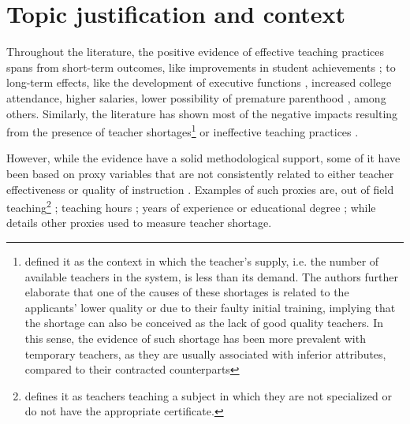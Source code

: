 \section{Topic justification and context}

Throughout the literature, the positive evidence of effective teaching practices spans from short-term outcomes, like improvements in student achievements \citep{Rockoff_2004, Rivkin_et_al_2005, Duflo_et_al_2009, Hanushek_et_al_2012, Muralidharan_et_al_2013, Chetty_et_al_2014a, Araujo_et_al_2016}; to long-term effects, like the development of executive functions \citep{Araujo_et_al_2016}, increased college attendance, higher salaries, lower possibility of premature parenthood \citep{Chetty_et_al_2014b}, among others. Similarly, the literature has shown most of the negative impacts resulting from the presence of teacher shortages\footnote{\citet{Bertoni_et_al_2020a} defined it as the context in which the teacher's supply, i.e. the number of available teachers in the system, is less than its demand. The authors further elaborate that one of the causes of these shortages is related to the applicants' lower quality or due to their faulty initial training, implying that the shortage can also be conceived as the lack of good quality teachers. In this sense, the evidence of such shortage has been more prevalent with temporary teachers, as they are usually associated with inferior attributes, compared to their contracted counterparts} or ineffective teaching practices \citep{Duflo_et_al_2009, Hanushek_et_al_2012, Muralidharan_et_al_2013, Duflo_et_al_2015, Ayala_2017, Marotta_2019}.

However, while the evidence have a solid methodological support, some of it have been based on proxy variables that are not consistently related to either teacher effectiveness or quality of instruction \citep{Hanushek_et_al_2006}. Examples of such proxies are, out of field teaching\footnote{\citet{Medeiros_et_al_2018} defines it as teachers teaching a subject in which they are not specialized or do not have the appropriate certificate.} \citep{Ingersoll_1998, Dee_et_al_2008, Bertoni_et_al_2020a}; teaching hours \citep{Bruns_et_al_2015}; years of experience or educational degree \citep{Rockoff_2004, Rivkin_et_al_2005, Clotfelter_et_al_2006, Clotfelter_et_al_2007, Hanushek_et_al_2012}; while \citet{Sutcher_et_al_2016} details other proxies used to measure teacher shortage. 

